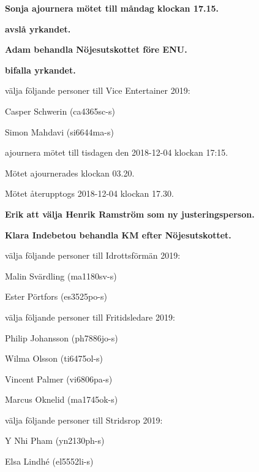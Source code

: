 \documentclass[10pt]{article}
\begin{document}
\begin{paragrafer}
\begin{paralist}
    \textbf{Sonja \ypa ajournera mötet till måndag klockan 17.15.}

    \textbf{\Mba avslå yrkandet.}

    \textbf{Adam \ypa behandla Nöjesutskottet före ENU.}

    \textbf{\Mba bifalla yrkandet.}

    \Mba välja följande personer till Vice Entertainer 2019:
    \begin{tightdashlist}
        \item Casper Schwerin (ca4365sc-s)
        \item Simon Mahdavi (si6644ma-s)
    \end{tightdashlist}
    
    \Mba ajournera mötet till tisdagen den 2018-12-04 klockan 17:15.
    
    Mötet ajournerades klockan 03.20.

    Mötet återupptogs 2018-12-04 klockan 17.30.

    \textbf{Erik \ypa att välja Henrik Ramström som ny justeringsperson.}

    \textbf{\Mbaby}

    \textbf{Klara Indebetou \ypa behandla KM efter Nöjesutskottet.}

    \textbf{\Mbaby}

    \Mba välja följande personer till Idrottsförmän 2019:
    \begin{tightdashlist}
        \item Malin Svärdling (ma1180sv-s)
        \item Ester Pörtfors (es3525po-s)
    \end{tightdashlist}

    \Mba välja följande personer till Fritidsledare 2019:
    \begin{tightdashlist}
        \item Philip Johansson (ph7886jo-s)
        \item Wilma Olsson (ti6475ol-s)
        \item Vincent Palmer (vi6806pa-s)
        \item Marcus Oknelid (ma1745ok-s)
    \end{tightdashlist}

    \Mba välja följande personer till Stridsrop 2019:
    \begin{tightdashlist}
        \item Y Nhi Pham (yn2130ph-s) 
        \item Elsa Lindhé (el5552li-s)
    \end{tightdashlist}


\end{paralist}
\end{paragrafer}
\end{document}
